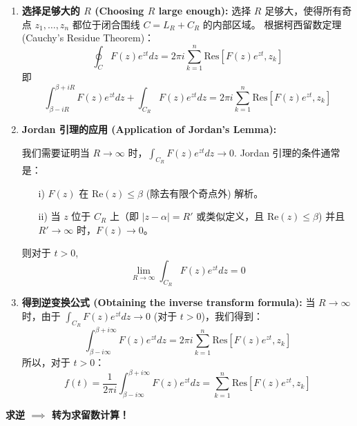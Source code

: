 \documentclass[linespread=1.5,openany]{book}%
\def\diff{d}%
\theoremstyle{plain}
\newcommand{\diff}{\mathop{}\!\mathrm{d}}  %
\begin{document}
{{{{{{{\begin{enumerate}[label=\arabic*)]
										\begin{itemize}
											\item $L_R$: 从 $\beta-iR$ 到 $\beta+iR$ 的直线段 (Bromwich 路径的一部分)。
											\item $C_R$: 一个位于直线 $L_R$ 左侧的半圆弧，使得所有 $F(z)$ 的奇点 $z_1, \dots, z_n$ 都被包含在由 $L_R$ 和 $C_R$ 组成的闭合围线 $C$ 内部。
											
										\end{itemize}
										
										\item \textbf{选择足够大的 $R$ (Choosing $R$ large enough):}
										选择 $R$ 足够大，使得所有奇点 $z_1, \dots, z_n$ 都位于闭合围线 $C = L_R + C_R$ 的内部区域。
										根据柯西留数定理 (Cauchy's Residue Theorem)：
										\begin{equation}
											\oint_C F(z)e^{zt} \diff z = 2\pi i \sum_{k=1}^{n} \text{Res}\left[F(z)e^{zt},z_k\right] 
										\end{equation}
										即
										\begin{equation}
											\int_{\beta-iR}^{\beta+iR} F(z)e^{zt} \diff z + \int_{C_R} F(z)e^{zt} \diff z = 2\pi i \sum_{k=1}^{n} \text{Res}\left[F(z)e^{zt},z_k\right] 
										\end{equation}
										
										\item \textbf{Jordan 引理的应用 (Application of Jordan's Lemma):}
										
										我们需要证明当 $R \to \infty$ 时，$\int_{C_R} F(z)e^{zt} \diff z \to 0$.
										Jordan 引理的条件通常是：
										\begin{itemize}
											\item[i)] $F(z)$ 在 $\text{Re}(z) \le \beta$ (除去有限个奇点外) 解析。
											\item[ii)] 当 $z$ 位于 $C_R$ 上（即 $|z-\alpha|=R'$ 或类似定义，且 $\text{Re}(z) \le \beta$) 并且 $R' \to \infty$ 时，$F(z) \to 0$。
										\end{itemize}
										则对于 $t>0$,
										\[ \lim_{R\to\infty} \int_{C_R} F(z)e^{zt} \diff z = 0 \]
										
										
										\item \textbf{得到逆变换公式 (Obtaining the inverse transform formula):}
										当 $R \to \infty$ 时，由于 $\int_{C_R} F(z)e^{zt} \diff z \to 0$ (对于 $t>0$)，我们得到：
										\[ \int_{\beta-i\infty}^{\beta+i\infty} F(z)e^{zt} \diff z = 2\pi i \sum_{k=1}^{n} \text{Res}\left[F(z)e^{zt},z_k \right] \]
										所以，对于 $t>0$：
										\begin{equation}
											f(t) = \frac{1}{2\pi i} \int_{\beta-i\infty}^{\beta+i\infty} F(z)e^{zt} \diff z = \sum_{k=1}^{n} \text{Res}\left[F(z)e^{zt},z_k \right] 
										\end{equation}
									\end{enumerate}
									\textbf{求逆 $\implies$ 转为求留数计算！
									} %
									
}}}}}}}
\end{document}
